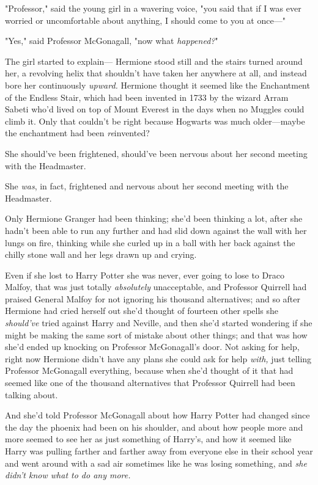 "Professor," said the young girl in a wavering voice, "you said that if I was
ever worried or uncomfortable about anything, I should come to you at once---"

"Yes," said Professor McGonagall, "now what \emph{happened?}"

The girl started to explain---
\later
Hermione stood still and the stairs turned around her, a revolving helix that
shouldn't have taken her anywhere at all, and instead bore her continuously
\emph{upward.} Hermione thought it seemed like the Enchantment of the Endless
Stair, which had been invented in 1733 by the wizard Arram Sabeti who'd lived
on top of Mount Everest in the days when no Muggles could climb it. Only that
couldn't be right because Hogwarts was much older---maybe the enchantment had
been \emph{re}invented?

She should've been frightened, should've been nervous about her second meeting
with the Headmaster.

She \emph{was}, in fact, frightened and nervous about her second meeting with
the Headmaster.

Only Hermione Granger had been thinking; she'd been thinking a lot, after she
hadn't been able to run any further and had slid down against the wall with her
lungs on fire, thinking while she curled up in a ball with her back against the
chilly stone wall and her legs drawn up and crying.

Even if she lost to Harry Potter she was never, ever going to lose to Draco
Malfoy, that was just totally \emph{absolutely} unacceptable, and Professor
Quirrell had praised General Malfoy for not ignoring his thousand alternatives;
and so after Hermione had cried herself out she'd thought of fourteen other
spells she \emph{should've} tried against Harry and Neville, and then she'd
started wondering if she might be making the same sort of mistake about other
things; and that was how she'd ended up knocking on Professor McGonagall's
door. Not asking for help, right now Hermione didn't have any plans she could
ask for help \emph{with,} just telling Professor McGonagall everything, because
when she'd thought of it that had seemed like one of the thousand alternatives
that Professor Quirrell had been talking about.

And she'd told Professor McGonagall about how Harry Potter had changed since
the day the phoenix had been on his shoulder, and about how people more and
more seemed to see her as just something of Harry's, and how it seemed like
Harry was pulling farther and farther away from everyone else in their school
year and went around with a sad air sometimes like he was losing something, and
\emph{she didn't know what to do any more.}

